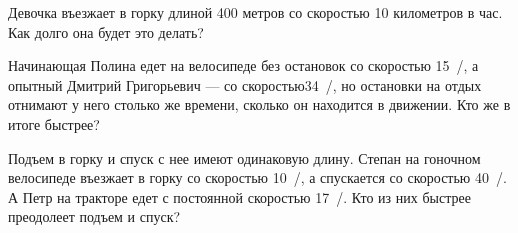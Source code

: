﻿
\begin{itemize}

\itA Девочка въезжает в горку длиной 400 метров со скоростью 10 километров в час. Как долго она будет это делать?

\itB Начинающая Полина едет на велосипеде без остановок со скоростью \SI{15}{/}, а опытный Дмитрий Григорьевич — со скоростью\linebreak \SI{34}{/}, но остановки на отдых отнимают у него столько же времени, сколько он находится в движении. Кто же в итоге быстрее?

\itC Подъем в горку и спуск с нее имеют одинаковую длину. Степан на гоночном велосипеде въезжает в горку со скоростью \SI{10}{/}, а спускается со скоростью \SI{40}{/}. А Петр на тракторе едет с постоянной скоростью \SI{17}{/}. Кто из них быстрее преодолеет подъем и спуск?
\end{itemize}